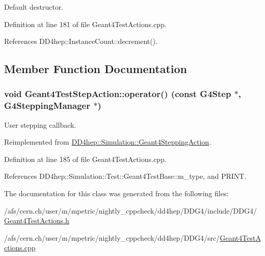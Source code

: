 Default destructor. 

Definition at line 181 of file Geant4TestActions.cpp.

References DD4hep::InstanceCount::decrement().

\subsection{Member Function Documentation}
\hypertarget{class_d_d4hep_1_1_simulation_1_1_test_1_1_geant4_test_step_action_a19d915e8a634552f25a839a92843258a}{
\subsubsection[{operator()}]{\setlength{\rightskip}{0pt plus 5cm}void Geant4TestStepAction::operator() (const G4Step $\ast$, \/  G4SteppingManager $\ast$)}}
\label{class_d_d4hep_1_1_simulation_1_1_test_1_1_geant4_test_step_action_a19d915e8a634552f25a839a92843258a}


User stepping callback. 

Reimplemented from \hyperlink{class_d_d4hep_1_1_simulation_1_1_geant4_stepping_action_ab6b61f6eaed6d06ddb3a7ed319258317}{DD4hep::Simulation::Geant4SteppingAction}.

Definition at line 185 of file Geant4TestActions.cpp.

References DD4hep::Simulation::Test::Geant4TestBase::m\_\-type, and PRINT.

The documentation for this class was generated from the following files:\begin{DoxyCompactItemize}
\item 
/afs/cern.ch/user/m/mpetric/nightly\_\-cppcheck/dd4hep/DDG4/include/DDG4/\hyperlink{_geant4_test_actions_8h}{Geant4TestActions.h}\item 
/afs/cern.ch/user/m/mpetric/nightly\_\-cppcheck/dd4hep/DDG4/src/\hyperlink{_geant4_test_actions_8cpp}{Geant4TestActions.cpp}\end{DoxyCompactItemize}
